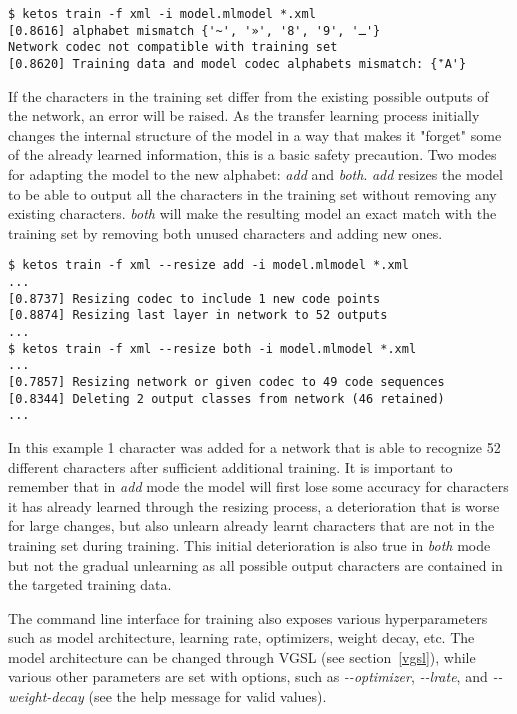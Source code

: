 \begin{verbatim}
$ ketos train -f xml -i model.mlmodel *.xml
[0.8616] alphabet mismatch {'~', '»', '8', '9', 'ـ'}
Network codec not compatible with training set
[0.8620] Training data and model codec alphabets mismatch: {'ٓA'}
\end{verbatim}

If the characters in the training set differ from the existing possible outputs
of the network, an error will be raised. As the transfer learning process
initially changes the internal structure of the model in a way that makes it
"forget" some of the already learned information, this is a basic safety
precaution. Two modes for adapting the model to the new alphabet: \emph{add}
and \emph{both}. \emph{add} resizes the model to be able to output all the
characters in the training set without removing any existing characters.
\emph{both} will make the resulting model an exact match with the training set
by removing both unused characters and adding new ones.

\begin{verbatim}
$ ketos train -f xml --resize add -i model.mlmodel *.xml
...
[0.8737] Resizing codec to include 1 new code points
[0.8874] Resizing last layer in network to 52 outputs
...
$ ketos train -f xml --resize both -i model.mlmodel *.xml
...
[0.7857] Resizing network or given codec to 49 code sequences
[0.8344] Deleting 2 output classes from network (46 retained)
...
\end{verbatim}

In this example 1 character was added for a network that is able to
recognize 52 different characters after sufficient additional training. It is
important to remember that in \emph{add} mode the model will first lose some
accuracy for characters it has already learned through the resizing process,
a deterioration that is worse for large changes, but also unlearn already
learnt characters that are not in the training set during training. This
initial deterioration is also true in \emph{both} mode but not the gradual
unlearning as all possible output characters are contained in the targeted
training data.

The command line interface for training also exposes various hyperparameters
such as model architecture, learning rate, optimizers, weight decay, etc. The
model architecture can be changed through VGSL (see section~\ref{vgsl}), while
various other parameters are set with options, such as \emph{-{}-optimizer},
\emph{-{}-lrate}, and \emph{-{}-weight-decay} (see the help message for valid
values). 

